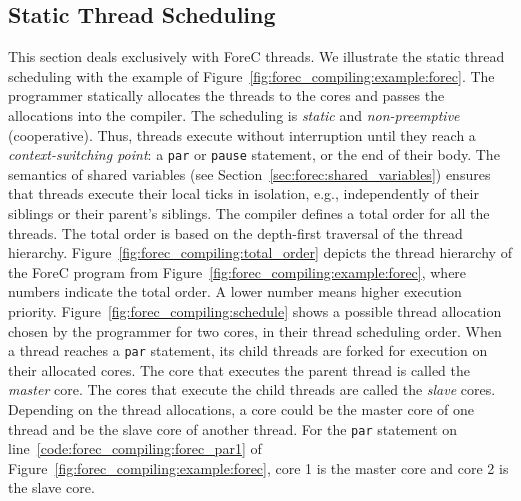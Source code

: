 \subsection{Static Thread Scheduling}
\label{sec:forec_compiling:scheduling}
This section deals exclusively with ForeC threads.
We illustrate the static thread scheduling with the 
example of Figure~\ref{fig:forec_compiling:example:forec}. 
The programmer statically allocates the
threads to the cores and passes the allocations into the
compiler. The scheduling is \emph{static} and \emph{non-preemptive}
(cooperative). Thus, threads execute without interruption
until they reach a \emph{context-switching point}: a \verb$par$ or
\verb$pause$ statement, or the end of their body. 
The semantics of shared variables (see Section~\ref{sec:forec:shared_variables}) 
ensures that threads execute their local ticks in isolation, e.g., 
independently of their siblings or their parent's siblings.
The compiler defines a total order for all the threads.
The total order is based on the depth-first traversal of the thread hierarchy.
Figure~\ref{fig:forec_compiling:total_order} depicts the thread
hierarchy of the ForeC program from Figure~\ref{fig:forec_compiling:example:forec},
where numbers indicate the total order. A lower number
means higher execution priority.
Figure~\ref{fig:forec_compiling:schedule} shows a possible
thread allocation chosen by the programmer for two cores, in their thread scheduling
order. When a thread reaches a \verb$par$ statement, its 
child threads are forked for execution on their allocated
cores. The core that executes the parent thread is
called the \emph{master} core.
The cores that execute the child threads are called 
the \emph{slave} cores. Depending 
on the thread allocations, a core could be the master core 
of one thread and be the slave core of another 
thread. For the \verb$par$ statement on 
line~\ref{code:forec_compiling:forec_par1} of 
Figure~\ref{fig:forec_compiling:example:forec},
core 1 is the master core and core 2 is the slave core.


